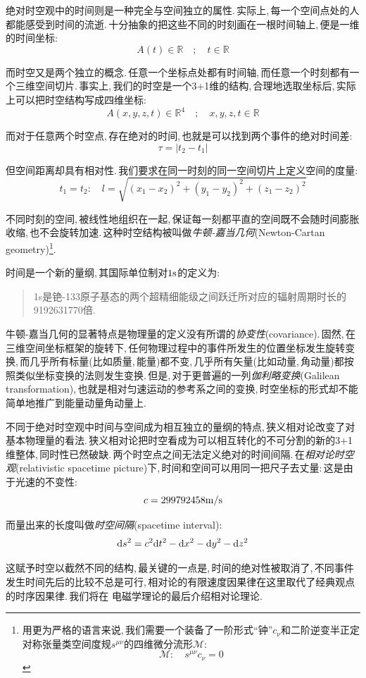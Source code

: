绝对时空观中的时间则是一种完全与空间独立的属性.\,实际上,\,每一个空间点处的人都能感受到时间的流逝.\,十分抽象的把这些不同的时刻画在一根时间轴上,\,便是一维的时间坐标:
\[A(t)\in\mathbb{R} \quad;\quad t\in\mathbb{R}\]

而时空又是两个独立的概念.\,任意一个坐标点处都有时间轴,\,而任意一个时刻都有一个三维空间切片.\,事实上,\,我们的时空是一个3+1维的结构,\,合理地选取坐标后,\,实际上可以把时空结构写成四维坐标:
\[A(x,y,z,t)\in\mathbb{R}^4 \quad;\quad x,y,z,t\in\mathbb{R}\]

而对于任意两个时空点,\,存在绝对的时间,\,也就是可以找到两个事件的绝对时间差:
\[\tau=|t_2-t_1|\]

但空间距离却具有相对性.\,我们要求在同一时刻的同一空间切片上定义空间的度量:
\[t_1=t_2:\quad l=\sqrt{(x_1-x_2)^2+(y_1-y_2)^2+(z_1-z_2)^2}\]

不同时刻的空间,\,被线性地组织在一起,\,保证每一刻都平直的空间既不会随时间膨胀收缩,\,也不会旋转加速.\,这种时空结构被叫做\emph{牛顿-嘉当几何}(Newton-Cartan geometry)\footnote{用更为严格的语言来说,\,我们需要一个装备了一阶形式``钟''$c_\nu$和二阶逆变半正定对称张量类空间度规$s^{\mu\nu}$的四维微分流形$\mathscr{M}$:
\[\mathscr{M}:\quad s^{\mu\nu}c_{\nu}=0\]}.

时间是一个新的量纲,\,其国际单位制对$1{\rm s}$的定义为:
\begin{verse}
1s是铯-133原子基态的两个超精细能级之间跃迁所对应的辐射周期时长的9192631770倍.
\end{verse}

牛顿-嘉当几何的显著特点是物理量的定义没有所谓的\emph{协变性}(covariance).\,固然,\,在三维空间坐标框架的旋转下,\,任何物理过程中的事件所发生的位置坐标发生旋转变换,\,而几乎所有标量(比如质量,\,能量)都不变,\,几乎所有矢量(比如动量,\,角动量)都按照类似坐标变换的法则发生变换.\,但是,\,对于更普遍的一列\emph{伽利略变换}(Galilean transformation),\,也就是相对匀速运动的参考系之间的变换,\,时空坐标的形式却不能简单地推广到能量动量角动量上.

不同于绝对时空观中时间与空间成为相互独立的量纲的特点,\,狭义相对论改变了对基本物理量的看法.\,狭义相对论把时空看成为可以相互转化的不可分割的新的3+1维整体,\,同时性已然破缺.\,两个时空点之间无法定义绝对的时间间隔.\,在\emph{相对论时空观}(relativistic spacetime picture)下,\,时间和空间可以用同一把尺子去丈量:\,这是由于光速的不变性:
\[c=299792458{\rm m/s}\]

而量出来的长度叫做\emph{时空间隔}(spacetime interval):
\[\textrm{d} s^2=c^2\textrm{d} t^2-\textrm{d} x^2-\textrm{d} y^2-\textrm{d} z^2\]

这赋予时空以截然不同的结构,\,最关键的一点是,\,时间的绝对性被取消了,\,不同事件发生时间先后的比较不总是可行,\,相对论的有限速度因果律在这里取代了经典观点的时序因果律.\,我们将在 电磁学理论的最后介绍相对论理论.



